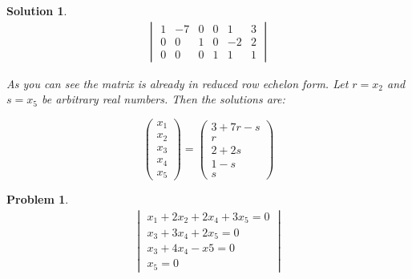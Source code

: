 \documentclass{article}
\newtheorem{problem}{Problem}
\newtheorem*{solution}{Solution}
\begin{document}
\begin{solution}

\begin{align*}
\begin{vmatrix}
1 & -7 & 0 & 0 & 1 & 3 \\
0 & 0 & 1 & 0 & -2 & 2 \\
0 & 0 & 0 & 1 & 1 & 1
\end{vmatrix}
\end{align*}

As you can see the matrix is already in reduced row echelon form. Let $r = x_{2}$ and $s = x_{5}$ be arbitrary real numbers. Then the solutions are:

\begin{equation*}
\begin{pmatrix}
x_{1} \\ x_{2} \\ x_{3} \\ x_{4} \\ x_{5} 
\end{pmatrix}
=
\begin{pmatrix}
3 + 7r - s \\
r \\
2 + 2s \\
1 - s \\
s
\end{pmatrix}
\end{equation*}

\end{solution}

\begin{problem}

\begin{align*}
\begin{vmatrix}
x_{1} + 2x_{2} + 2x_{4} + 3x_{5} = 0 \\
x_{3} + 3x_{4} + 2x_{5} = 0 \\
x_{3} + 4x_{4} - x{5} = 0 \\
x_{5} = 0
\end{vmatrix}
\end{align*}

\end{problem}
\end{document}
